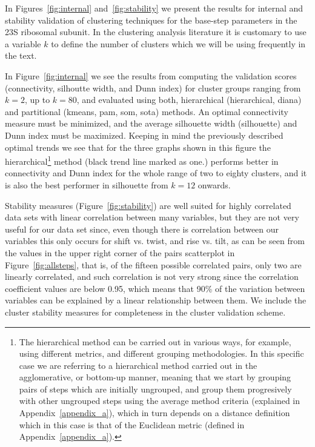In  Figures~\ref{fig:internal} and~\ref{fig:stability} we  present the
results for internal and stability validation of clustering techniques
for the  base-step parameters  in the 23S  ribosomal subunit.   In the
clustering analysis literature  it is customary to use  a variable $k$
to define the number of clusters  which we will be using frequently in
the text.

In  Figure~\ref{fig:internal} we  see the  results from  computing the
validation scores (connectivity, silhoutte  width, and Dunn index) for
cluster groups ranging  from $k=2$, up to $k=80$,  and evaluated using
both, hierarchical (hierarchical, diana) and partitional (kmeans, pam,
som, sota) methods. An optimal connectivity measure must be minimized,
and the average  silhouette width (silhouette) and Dunn  index must be
maximized.  Keeping in mind the previously described optimal trends we
see  that  for   the  three  graphs  shown  in   this  figure  the
hierarchical\footnote{The  hierarchical method can  be carried  out in
  various ways,  for example,  using different metrics,  and different
  grouping methodologies.  In this specific case we are referring to a
  hierarchical method  carried out in the  agglomerative, or bottom-up
  manner, meaning that  we start by grouping pairs  of steps which are
  initially  ungrouped,   and  group  them   progresively  with  other
  ungrouped  steps using  the  average method  criteria (explained  in
  Appendix~\ref{appendix_a}),  which  in turn  depends  on a  distance
  definition  which in  this  case  is that  of  the Euclidean  metric
  (defined in  Appendix~\ref{appendix_a}).}  method (black  trend line
marked  as one.)  performs  better in connectivity and  Dunn index
for the whole range of two to eighty clusters, and it is also the best
performer in silhouette from $k=12$ onwards.

Stability  measures (Figure~\ref{fig:stability})  are well  suited for
highly  correlated  data sets  with  linear  correlation between  many
variables, but they  are not very useful for our  data set since, even
though there is correlation between our variables this only occurs for
shift vs. twist, and rise vs. tilt,  as can be seen from the values in
the    upper   right    corner   of    the   pairs    scatterplot   in
Figure~\ref{fig:allsteps},  that   is,  of  the   fifteen  possible
correlated  pairs,   only  two  are  linearly   correlated,  and  such
correlation  is  not very  strong  since  the correlation  coefficient
values are below 0.95, which  means that 90\% of the variation between
variables can be  explained by a linear relationship  between them. We
include the cluster stability measures for completeness in the cluster
validation scheme.


